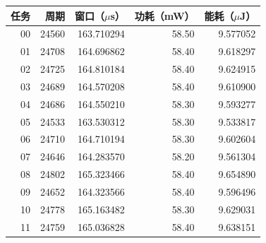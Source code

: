 \begin{tabular}{rrrrr}\toprule
任务 & 周期 & 窗口（$\mu$s） & 功耗（mW） & 能耗（$\mu$J）\\\midrule
00 & 24560 & 163.710294 & 58.50 & 9.577052 \\
01 & 24708 & 164.696862 & 58.40 & 9.618297 \\
02 & 24725 & 164.810184 & 58.40 & 9.624915 \\
03 & 24689 & 164.570208 & 58.40 & 9.610900 \\
04 & 24686 & 164.550210 & 58.30 & 9.593277 \\
05 & 24533 & 163.530312 & 58.30 & 9.533817 \\
06 & 24710 & 164.710194 & 58.30 & 9.602604 \\
07 & 24646 & 164.283570 & 58.20 & 9.561304 \\
08 & 24802 & 165.323466 & 58.40 & 9.654890 \\
09 & 24652 & 164.323566 & 58.40 & 9.596496 \\
10 & 24778 & 165.163482 & 58.30 & 9.629031 \\
11 & 24759 & 165.036828 & 58.40 & 9.638151 \\
\bottomrule\end{tabular}
